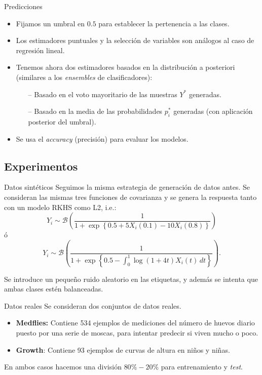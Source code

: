 \documentclass[10pt, english, professionalfonts]{beamer}
\begin{document}
\begin{frame}{Predicciones}

\begin{itemize}
  \item Fijamos un umbral en \(0.5\) para establecer la pertenencia a las clases.
   \item Los estimadores puntuales y la selección de variables son análogos al caso de regresión lineal.
   \item Tenemos ahora dos estimadores basados en la distribución a posteriori (similares a los \textit{ensembles} de clasificadores):
   \begin{itemize}
     \item[--] Basado en el voto mayoritario de las muestras \(Y^*\) generadas.
     \item[--] Basado en la media de las probabilidades \(p_i^*\) generadas (con aplicación posterior del umbral).
   \end{itemize}
  \item Se usa el \textit{accuracy} (precisión) para evaluar los modelos.
\end{itemize}
\end{frame}

\subsection{Experimentos}

\begin{frame}{Datos sintéticos}
Seguimos la misma estrategia de generación de datos antes. Se consideran las mismas tres funciones de covarianza y se genera la respuesta tanto con un modelo RKHS como L2, i.e.:
  \[
    Y_i \sim \mathcal B\left(\frac{1}{1 + \exp\left\{0.5 + 5X_i(0.1) - 10X_i(0.8)\right\}}\right)
  \]
  ó
  \[
    Y_i \sim \mathcal B\left(\frac{1}{1 + \exp\left\{0.5 -\int_0^1 \log(1+4t)X_i(t)\, dt\right\}}\right).
  \]

  \vspace{1em}

  Se introduce un pequeño ruido aleatorio en las etiquetas, y además se intenta que ambas clases estén balanceadas.

\end{frame}

\begin{frame}{Datos reales}
  Se consideran dos conjuntos de datos reales.
  \begin{itemize}
    \item \textbf{Medflies:} Contiene 534 ejemplos de mediciones del número de huevos diario puesto por una serie de moscas, para intentar predecir si viven mucho o poco.
    \item \textbf{Growth}: Contiene 93 ejemplos de curvas de altura en niños y niñas.
  \end{itemize}

  En ambos casos hacemos una división \(80\%-20\%\) para entrenamiento y \textit{test}.
\end{frame}
\end{document}
